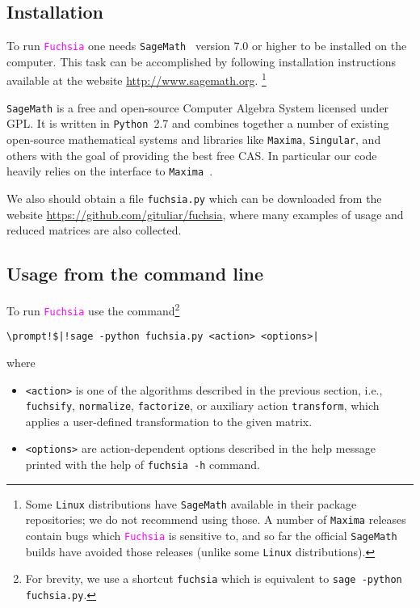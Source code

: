 \documentclass{elsarticle}
\newcommand{\fuchsia}{\textcolor{fuchsia}{\texttt{Fuchsia}}\xspace}
\newcommand{\linux}{\texttt{Linux}\xspace}
\newcommand{\maxima}{\texttt{Maxima}\xspace}
\newcommand{\python}{\texttt{Python}\xspace}
\newcommand{\sage}{\texttt{SageMath}\xspace}
\newcommand{\code}[1]{\texttt{#1}}
\newcommand{\prompt}[2]{\textcolor{prompt}{#1} \textcolor{command}{#2}}
\begin{document}
\subsection{Installation}

To run \fuchsia one needs \sage~\cite{sagemath} version 7.0 or higher to be installed on the computer.
This task can be accomplished by following installation instructions available at the website \url{http://www.sagemath.org}.
\footnote{
    Some \linux distributions have \sage available in their package repositories; we do not recommend using those.
    A number of \maxima releases contain bugs which \fuchsia is sensitive to, and so far the official \sage builds have avoided those releases (unlike some \linux distributions).
}

\sage is a free and open-source Computer Algebra System licensed under GPL.
It is written in \python~2.7 and combines together a number of existing open-source mathematical systems and libraries like \texttt{Maxima}, \texttt{Singular}, and others with the goal of providing the best free CAS.
In particular our code heavily relies on the interface to \maxima~\cite{maxima}.

We also should obtain a file \code{fuchsia.py} which can be downloaded from the website \url{https://github.com/gituliar/fuchsia}, where many examples of usage and reduced matrices are also collected.


\vspace{10mm}

\subsection{Usage from the command line}

To run \fuchsia use the command\footnote{For brevity, we use a shortcut \code{fuchsia} which is equivalent to \code{sage -python fuchsia.py}.}
\begin{Verbatim}[commandchars=\\!|]
    \prompt!$|!sage -python fuchsia.py <action> <options>|
\end{Verbatim}
where
\begin{itemize}
  \item \code{<action>} is one of the algorithms described in the previous section, i.e., \code{fuchsify}, \code{normalize}, \code{factorize}, or auxiliary action \code{transform}, which applies a user-defined transformation to the given matrix.
  \item \code{<options>} are action-dependent options described in the help message printed with the help of \code{fuchsia -h} command.
\end{itemize}
\end{document}
